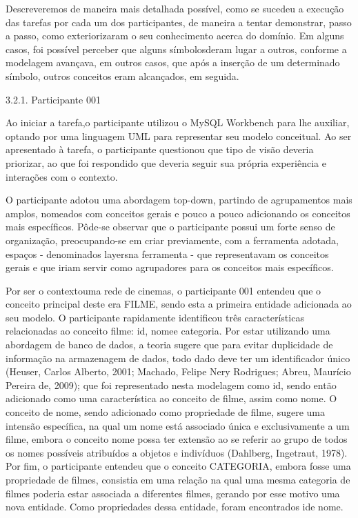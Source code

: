 Descreveremos de maneira mais detalhada possível, como se sucedeu a execução das tarefas por cada um dos participantes, de maneira a tentar demonstrar, passo a passo, como exteriorizaram o seu conhecimento acerca do domínio. Em alguns casos, foi possível perceber que alguns símbolosderam lugar a outros, conforme a modelagem avançava, em outros casos, que após a inserção de um determinado símbolo, outros conceitos eram alcançados, em seguida.

3.2.1. Participante 001

Ao iniciar a tarefa,o participante utilizou o MySQL Workbench para lhe auxiliar, optando por uma linguagem UML para representar seu modelo conceitual. Ao ser apresentado à tarefa, o participante questionou que tipo de visão deveria priorizar, ao que foi respondido que deveria seguir sua própria experiência e interações com o contexto.

O participante adotou uma abordagem top-down, partindo de agrupamentos mais amplos, nomeados com conceitos gerais e pouco a pouco adicionando os conceitos mais específicos. Pôde-se observar que o participante possui um forte senso de organização, preocupando-se em criar previamente, com a ferramenta adotada, espaços - denominados layersna ferramenta - que representavam os conceitos gerais e que iriam servir como agrupadores para os conceitos mais específicos.

Por ser o contextouma rede de cinemas, o participante 001 entendeu que o conceito principal deste era FILME, sendo esta a primeira entidade adicionada ao seu modelo. O participante rapidamente identificou três características relacionadas ao conceito filme: id, nomee categoria. Por estar utilizando uma abordagem de banco de dados, a teoria sugere que para evitar duplicidade de informação na armazenagem de dados, todo dado deve ter um identificador único (Heuser, Carlos Alberto, 2001; Machado, Felipe Nery Rodrigues; Abreu, Maurício Pereira de, 2009); que foi representado nesta modelagem como id, sendo então adicionado como uma característica ao conceito de filme, assim como nome. O conceito de nome, sendo adicionado como propriedade de filme, sugere uma intensão específica, na qual um nome está associado única e exclusivamente a um filme, embora o conceito nome possa ter extensão ao se referir ao grupo de todos os nomes possíveis atribuídos a objetos e indivíduos (Dahlberg, Ingetraut, 1978). Por fim, o participante entendeu que o conceito CATEGORIA, embora fosse uma propriedade de filmes, consistia em uma relação na qual uma mesma categoria de filmes poderia estar associada a diferentes filmes, gerando por esse motivo uma nova entidade. Como propriedades dessa entidade, foram encontrados ide nome.

